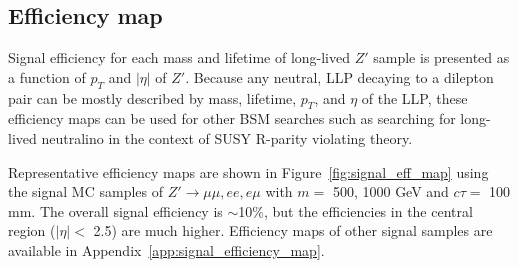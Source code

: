 \subsection{Efficiency map}
\label{sec:efficiency_map}
Signal efficiency for each mass and lifetime of long-lived $Z'$ sample is presented as a function of $p_{T}$ and $|\eta|$ of $Z'$. Because any neutral, LLP decaying to a dilepton pair can be mostly described by mass, lifetime, $p_{T}$, and $\eta$ of the LLP, these efficiency maps can be used for other BSM searches such as searching for long-lived neutralino in the context of SUSY R-parity violating theory.

Representative efficiency maps are shown in Figure~\ref{fig:signal_eff_map} using the signal MC samples of $Z' \rightarrow \mu\mu, ee, e\mu$ with $m=$ 500, 1000 GeV and $c\tau=$ 100 mm. The overall signal efficiency is $\sim$10\%, but the efficiencies in the central region ($|\eta| < $ 2.5) are much higher. Efficiency maps of other signal samples are available in Appendix~\ref{app:signal_efficiency_map}.

